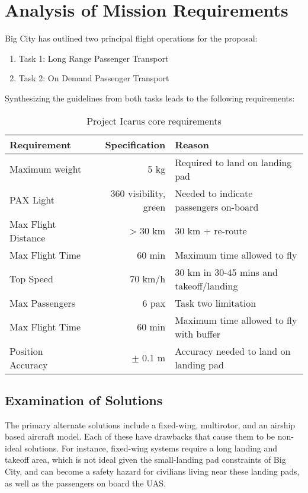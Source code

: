 \section{Analysis of Mission Requirements}
\label{sec:analysis}

Big City has outlined two principal flight operations for the proposal:
\begin{enumerate}
    \item Task 1: Long Range Passenger Transport
    \item Task 2: On Demand Passenger Transport
\end{enumerate}
Synthesizing the guidelines from both tasks leads to the following requirements:
{
\renewcommand{\arraystretch}{1.1}
\begin{table}[h]
\centering
\begin{tabular}{lrl}
\color{hyperrideblue} \textbf{Requirement} &
\color{hyperrideblue} \textbf{Specification} &
\color{hyperrideblue} \textbf{Reason}                   \\ \midrule
    Maximum weight       & 5 kg           & Required to land on landing pad        \\
	PAX Light            & 360\textdegree{}  visibility, green    & Needed to indicate passengers on-board \\
Max Flight Distance  & > 30 km       & 30 km + re-route                        \\
Max Flight Time      & 60 min        & Maximum time allowed to fly            \\
Top Speed            & 70 km/h       & 30 km in 30-45 mins and takeoff/landing\\  
Max Passengers       & 6 pax         & Task two limitation                    \\
Max Flight Time      & 60 min        & Maximum time allowed to fly with buffer \\
Position Accuracy    & $\pm$ 0.1 m   & Accuracy needed to land on landing pad
\end{tabular}
\caption{Project Icarus core requirements}
\end{table}
}

\subsection{Examination of Solutions}
\label{sec:solutions}

The primary alternate solutions include a fixed-wing, multirotor, and an
airship based aircraft model. Each of these have drawbacks that cause them to
be non-ideal solutions. For instance, fixed-wing systems require a long landing
and takeoff area, which is not ideal given the small-landing pad constraints of
Big City, and can become a safety hazard for civilians living near these
landing pads, as well as the passengers on board the UAS.

